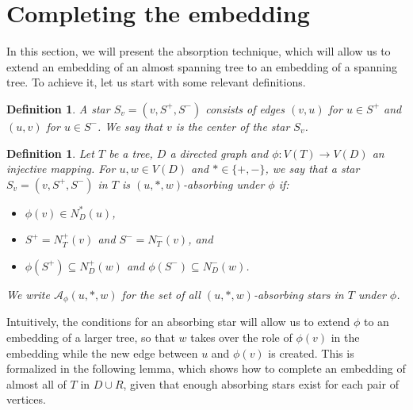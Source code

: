 \documentclass[10pt, a4paper]{article}
\newtheorem{definition}[theorem]{Definition}
\theoremstyle{remark}
\begin{document}
\section{Completing the embedding}\label{section:absorption}
In this section, we will present the absorption technique, which will allow us to extend an embedding of an almost spanning tree to an embedding of a spanning tree.
To achieve it, let us start with some relevant definitions.
\begin{definition}
    A \emph{star} $S_v = (v, S^+, S^-)$ consists of edges $(v, u)$ for $u \in S^+$ and $(u,v)$ for $u \in S^-$.
    We say that $v$ is the \emph{center} of the star $S_v$.
\end{definition}

\begin{definition}
    Let $T$ be a tree, $D$ a directed graph and $\phi: V(T) \to V(D)$ an injective mapping.
    For $u, w \in V(D)$ and $* \in \{+, -\}$, we say that a star  $S_v = (v, S^+, S^-)$ in $T$ is $(u,*,w)$-absorbing under $\phi$ if:
    \begin{itemize}
        \item $\phi(v) \in N_D^*(u)$,
        \item $S^+ = N_T^+(v)$ and $S^- = N_T^-(v)$, \emph{and}
        \item $\phi(S^+) \subseteq N_D^+(w)$ and $\phi(S^-) \subseteq N_D^-(w)$.
    \end{itemize}
    We write $\mathcal{A}_\phi(u,*,w)$ for the set of all $(u,*,w)$-absorbing stars in $T$ under $\phi$.
\end{definition}
Intuitively, the conditions for an absorbing star will allow us to extend $\phi$ to an embedding of a larger tree,
so that $w$ takes over the role of $\phi(v)$ in the embedding while the new edge between $u$ and $\phi(v)$ is created.
This is formalized in the following lemma, which shows how to complete an embedding of almost all of $T$ in $D \cup R$,
given that enough absorbing stars exist for each pair of vertices. 
\end{document}
